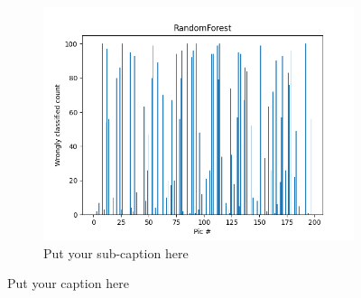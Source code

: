\documentclass{article}
\begin{document}
\begin{figure}[ht]
\begin{subfigure}{.33\textwidth}
  \includegraphics[width=1\linewidth]{1a/Random Forest.png}  
  \caption{Put your sub-caption here}
  \label{fig:sub-second}
\end{subfigure}
\caption{Put your caption here}
\label{wrong}
\end{figure}
\end{document}
